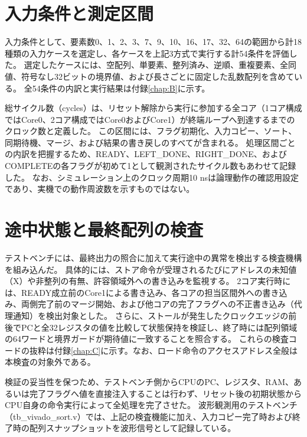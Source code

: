 \section{入力条件と測定区間}\label{sec:3-2}

入力条件として、要素数0、1、2、3、7、9、10、16、17、32、64の範囲から計18種類の入力ケースを選定し、各ケースを上記3方式で実行する計54条件を評価した。
選定したケースには、空配列、単要素、整列済み、逆順、重複要素、全同値、符号なし32ビットの境界値、および長さごとに固定した乱数配列を含めている。
全54条件の内訳と実行結果は付録\ref{chap:B}に示す。

総サイクル数（cycles）は、リセット解除から実行に参加する全コア（1コア構成ではCore0、2コア構成ではCore0およびCore1）が終端ループへ到達するまでのクロック数と定義した。
この区間には、フラグ初期化、入力コピー、ソート、同期待機、マージ、および結果の書き戻しのすべてが含まれる。
処理区間ごとの内訳を把握するため、READY、LEFT\_DONE、RIGHT\_DONE、およびCOMPLETEの各フラグが初めて1として観測されたサイクル数もあわせて記録した。
なお、シミュレーション上のクロック周期10 nsは論理動作の確認用設定であり、実機での動作周波数を示すものではない。

\section{途中状態と最終配列の検査}\label{sec:3-3}

テストベンチには、最終出力の照合に加えて実行途中の異常を検出する検査機構を組み込んだ。
具体的には、ストア命令が受理されるたびにアドレスの未知値（X）や非整列の有無、許容領域外への書き込みを監視する。
2コア実行時には、READY成立前のCore1による書き込み、各コアの担当区間外への書き込み、両側完了前のマージ開始、および他コアの完了フラグへの不正書き込み（代理通知）を検出対象とした。
さらに、ストールが発生したクロックエッジの前後でPCと全32レジスタの値を比較して状態保持を検証し、終了時には配列領域の64ワードと境界ガードが期待値に一致することを照合する。
これらの検査コードの抜粋は付録\ref{chap:C}に示す。なお、ロード命令のアクセスアドレス全般は本検査の対象外である。

検証の妥当性を保つため、テストベンチ側からCPUのPC、レジスタ、RAM、あるいは完了フラグへ値を直接注入することは行わず、リセット後の初期状態からCPU自身の命令実行によって全処理を完了させた。
波形観測用のテストベンチ（tb\_vivado\_sort.v）では、上記の検査機能に加え、入力コピー完了時および終了時の配列スナップショットを波形信号として記録している。
